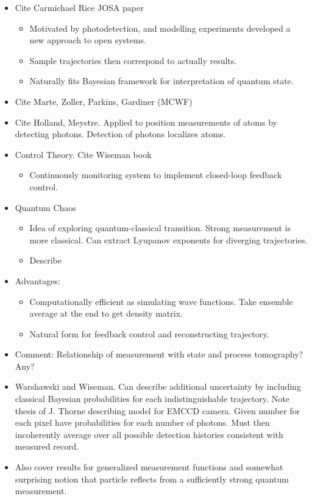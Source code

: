 \begin{itemize}
\item Cite Carmichael Rice JOSA paper
\begin{itemize}
\item Motivated by photodetection, and modelling experiments developed a new approach to open systems.  
\item Sample trajectories then correspond to actually results.
\item Naturally fits Bayesian framework for interpretation of quantum state.  
\end{itemize}
\item Cite Marte, Zoller, Parkins, Gardiner (MCWF)
\item Cite Holland, Meystre.  Applied to position measurements of atoms by detecting photons.  Detection of photons localizes atoms.  
\item Control Theory.  Cite Wiseman book
\begin{itemize}
  \item Continuously monitoring system to implement closed-loop feedback control.  
\end{itemize}
\item Quantum Chaos
\begin{itemize}
  \item Idea of exploring quantum-classical transition.  Strong measurement is more classical.  Can extract Lyupanov exponents for diverging trajectories.  
  \item Describe 
\end{itemize}
\item Advantages:
\begin{itemize}
  \item Computationally efficient as simulating wave functions.  Take ensemble average at the end to get density matrix.  
  \item Natural form for feedback control and reconstructing trajectory.  
\end{itemize}
\item Comment: Relationship of measurement with state and process tomography?  Any?  

\item Warshawski and Wiseman.  Can describe additional uncertainty by including classical Bayesian probabilities for each indistinguishable trajectory.  Note thesis of J. Thorne describing model for EMCCD camera.  Given number for each pixel have probabilities for each number of photons.  Must then incoherently average over all possible detection histories consistent with measured record.  
\item Also cover results for generalized measurement functions and somewhat surprising notion that particle reflects from a sufficiently strong quantum measurement.  
\end{itemize}

